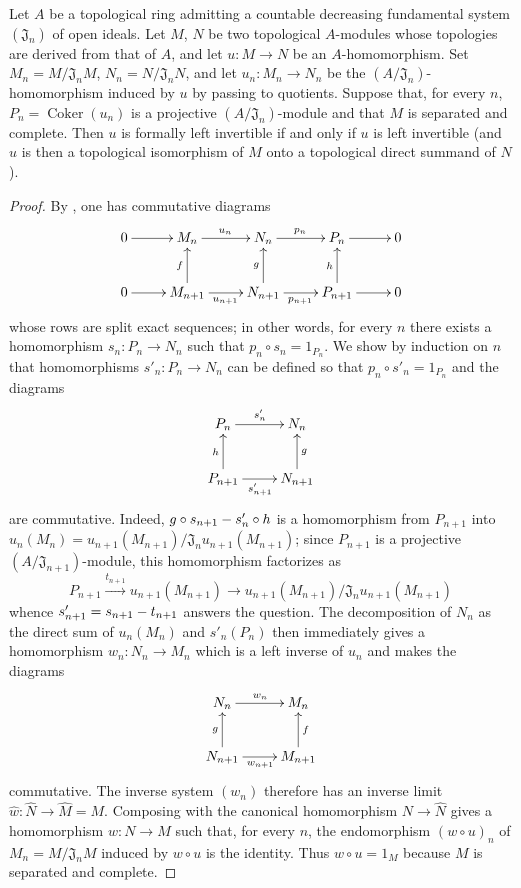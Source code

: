 \begin{proposition}[19.1.8]
\label{0.19.1.8}
Let $A$ be a topological ring admitting a countable decreasing fundamental system $(\mathfrak J_n)$ of open ideals.
Let $M$, $N$ be two topological $A$-modules whose topologies are derived from that of $A$, and let $u:M\to N$ be an $A$-homomorphism.
Set $M_n=M/\mathfrak J_nM$, $N_n=N/\mathfrak J_nN$, and let $u_n:M_n\to N_n$ be the $(A/\mathfrak J_n)$-homomorphism induced by $u$ by passing to quotients.
Suppose that, for every $n$, $P_n=\operatorname{Coker}(u_n)$ is a projective $(A/\mathfrak J_n)$-module and that $M$ is separated and complete.
Then $u$ is formally left invertible if and only if $u$ is left invertible \textup{(and $u$ is then a topological isomorphism of $M$ onto a topological direct summand of $N$)}.
\end{proposition}


\begin{proof}
By , one has commutative diagrams
\[
  \xymatrix{
    0\ar[r] & M_n\ar[r]^{u_n} & N_n\ar[r]^{p_n} & P_n\ar[r] & 0\\
    0\ar[r] & M_{n+1}\ar[u]^f\ar[r]_{u_{n+1}} &
      N_{n+1}\ar[u]^g\ar[r]_{p_{n+1}} & P_{n+1}\ar[u]^h\ar[r] & 0
  }
\]
whose rows are split exact sequences;
in other words, for every $n$ there exists a homomorphism $s_n:P_n\to N_n$ such that $p_n\circ s_n=1_{P_n}$.
We show by induction on $n$ that homomorphisms $s'_n:P_n\to N_n$ can be defined so that $p_n\circ s'_n=1_{P_n}$ and the diagrams
\[
  \xymatrix{
    P_n\ar[r]^{s'_n} & N_n\\
    P_{n+1}\ar[u]^h\ar[r]_{s'_{n+1}} & N_{n+1}\ar[u]_g
  }
\]
are commutative.
Indeed, $g\circ s_{n+1}- s'_n\circ h$ is a homomorphism from $P_{n+1}$ into $u_n(M_n)=u_{n+1}(M_{n+1})/\mathfrak J_nu_{n+1}(M_{n+1})$;
since $P_{n+1}$ is a projective $(A/\mathfrak J_{n+1})$-module, this homomorphism factorizes as
\[
  P_{n+1}\xrightarrow{t_{n+1}}u_{n+1}(M_{n+1})
  \longrightarrow
  u_{n+1}(M_{n+1})/\mathfrak J_nu_{n+1}(M_{n+1})
\]
whence $s'_{n+1}=s_{n+1}- t_{n+1}$ answers the question.
The decomposition of $N_n$ as the direct sum of $u_n(M_n)$ and $s'_n(P_n)$ then immediately gives a homomorphism $w_n:N_n\to M_n$ which is a left inverse of $u_n$ and makes the diagrams
\[
  \xymatrix{
    N_n\ar[r]^{w_n} & M_n\\
    N_{n+1}\ar[u]^g\ar[r]_{w_{n+1}} & M_{n+1}\ar[u]_f
  }
\]
commutative.
The inverse system $(w_n)$ therefore has an inverse limit $\widehat w:\widehat N\to\widehat M=M$.
Composing with the canonical homomorphism $N\to\widehat N$ gives a homomorphism $w:N\to M$ such that, for every $n$, the endomorphism $(w\circ u)_n$ of $M_n=M/\mathfrak J_nM$ induced by $w\circ u$ is the identity.
Thus $w\circ u=1_M$ because $M$ is separated and complete.
\end{proof}

